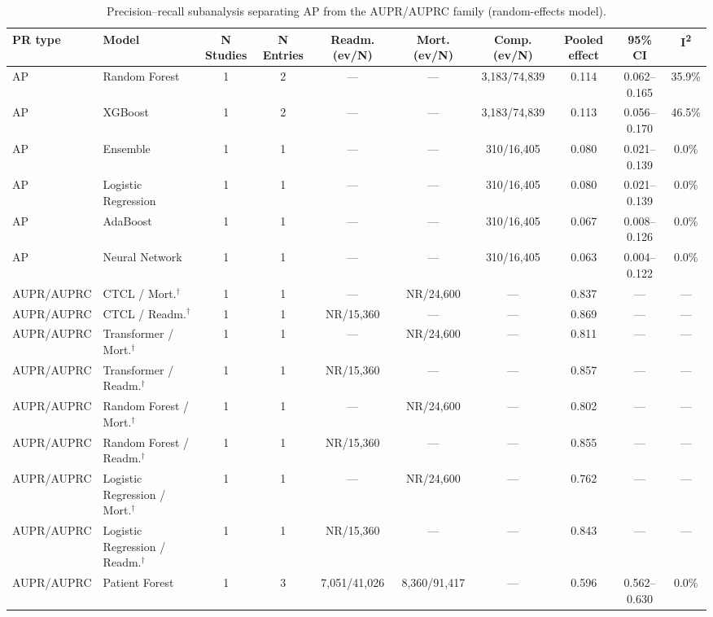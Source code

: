 \begin{table}[H]
\centering
\caption{Precision--recall subanalysis separating AP from the AUPR/AUPRC family (random-effects model).}\label{tab:subgroup_pr}
\small
\begin{adjustbox}{max width=\textwidth}
\begin{tabular}{llcccccccc}
\toprule
\textbf{PR type} & \textbf{Model} & \textbf{N Studies} & \textbf{N Entries} & \textbf{Readm. (ev/N)} & \textbf{Mort. (ev/N)} & \textbf{Comp. (ev/N)} & \textbf{Pooled effect} & \textbf{95\% CI} & \textbf{I\textsuperscript{2}} \\
\midrule
    AP & Random Forest & 1 & 2 & --- & --- & 3,183/74,839 & 0.114 & 0.062--0.165 & 35.9\% \\
    AP & XGBoost & 1 & 2 & --- & --- & 3,183/74,839 & 0.113 & 0.056--0.170 & 46.5\% \\
    AP & Ensemble & 1 & 1 & --- & --- & 310/16,405 & 0.080 & 0.021--0.139 & 0.0\% \\
    AP & Logistic Regression & 1 & 1 & --- & --- & 310/16,405 & 0.080 & 0.021--0.139 & 0.0\% \\
    AP & AdaBoost & 1 & 1 & --- & --- & 310/16,405 & 0.067 & 0.008--0.126 & 0.0\% \\
    AP & Neural Network & 1 & 1 & --- & --- & 310/16,405 & 0.063 & 0.004--0.122 & 0.0\% \\
    AUPR/AUPRC & CTCL / Mort.$^\dagger$ & 1 & 1 & --- & NR/24,600 & --- & 0.837 & --- & --- \\
    AUPR/AUPRC & CTCL / Readm.$^\dagger$ & 1 & 1 & NR/15,360 & --- & --- & 0.869 & --- & --- \\
    AUPR/AUPRC & Transformer / Mort.$^\dagger$ & 1 & 1 & --- & NR/24,600 & --- & 0.811 & --- & --- \\
    AUPR/AUPRC & Transformer / Readm.$^\dagger$ & 1 & 1 & NR/15,360 & --- & --- & 0.857 & --- & --- \\
    AUPR/AUPRC & Random Forest / Mort.$^\dagger$ & 1 & 1 & --- & NR/24,600 & --- & 0.802 & --- & --- \\
    AUPR/AUPRC & Random Forest / Readm.$^\dagger$ & 1 & 1 & NR/15,360 & --- & --- & 0.855 & --- & --- \\
    AUPR/AUPRC & Logistic Regression / Mort.$^\dagger$ & 1 & 1 & --- & NR/24,600 & --- & 0.762 & --- & --- \\
    AUPR/AUPRC & Logistic Regression / Readm.$^\dagger$ & 1 & 1 & NR/15,360 & --- & --- & 0.843 & --- & --- \\
    AUPR/AUPRC & Patient Forest & 1 & 3 & 7,051/41,026 & 8,360/91,417 & --- & 0.596 & 0.562--0.630 & 0.0\% \\

\end{tabular}
\end{adjustbox}
\end{table}
